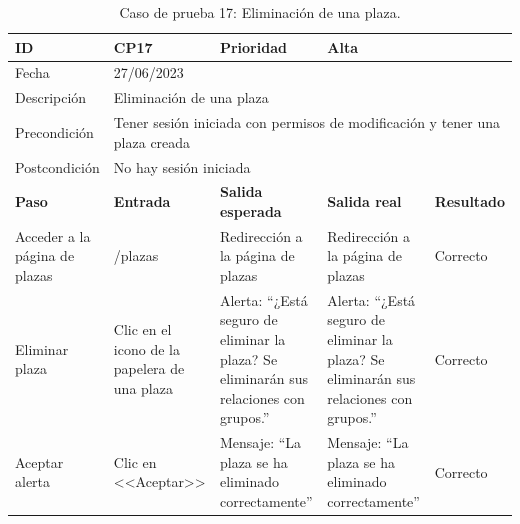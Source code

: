 \begin{table}[H]
\begin{tabular}{p{} p{} p{} p{} p{}}
\cellcolor{gray!25}
ID   & CP17 & \cellcolor{gray!25} Prioridad   & Alta \\ \hline
\cellcolor{gray!25} Fecha	&	\multicolumn{4}{l}{27/06/2023} \\ \hline
\cellcolor{gray!25} Descripción		&	\multicolumn{4}{l}{Eliminación de una plaza} \\ \hline                                            
\cellcolor{gray!25}
Precondición  & \multicolumn{4}{p{.66\textwidth}}{Tener sesión iniciada con permisos de modificación y tener una plaza creada} \\ \hline
\cellcolor{gray!25} Postcondición & \multicolumn{4}{l}{No hay sesión iniciada}                                                    \\ \hline
\rowcolor{gray!25}
\textbf{Paso}   & \textbf{Entrada} & \textbf{Salida esperada} & \textbf{Salida real} & \textbf{Resultado} \\ \hline
Acceder a la página de plazas 
& /plazas                                                                          
& Redirección a la página de plazas                                   
& Redirección a la página de plazas                                   
& Correcto                            
\\ \hline
Eliminar plaza
& Clic en el icono de la papelera de una plaza
& Alerta: ``¿Está seguro de eliminar la plaza? Se eliminarán sus relaciones con grupos.''
& Alerta: ``¿Está seguro de eliminar la plaza? Se eliminarán sus relaciones con grupos.''
& Correcto
\\ \hline
Aceptar alerta
& Clic en <<Aceptar>>
& Mensaje: ``La plaza se ha eliminado correctamente'' 
& Mensaje: ``La plaza se ha eliminado correctamente'' 
& Correcto
\\ \hline             
\end{tabular}
\caption{Caso de prueba 17: Eliminación de una plaza.}
\end{table}

